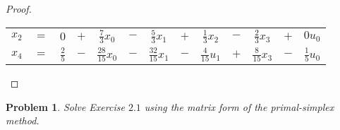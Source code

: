\documentclass[12pt,oneside]{amsart}
\numberwithin{equation}{section}
\numberwithin{figure}{section}
\theoremstyle{plain}
\newtheorem{prob}{Problem}
\theoremstyle{definition}
\begin{document}
\begin{proof}
\begin{enumerate}
\begin{center}
\begin{tabular}{|ccccccccccccc|}
    \hline
    $x_2$   & $=$ & $0$            & $+$ & $\frac{7}{3}x_0$   & $-$ & $\frac{5}{3}x_1$   & $+$ & $\frac{1}{3}x_2$  & $-$ & $\frac{2}{3}x_3$  & $+$ & $0u_0$            \\
    $x_4$   & $=$ & $\frac{2}{5}$  & $-$ & $\frac{28}{15}x_0$ & $-$ & $\frac{32}{15}x_1$ & $-$ & $\frac{4}{15}u_1$ & $+$ & $\frac{8}{15}x_3$ & $-$ & $\frac{1}{5}u_0$  \\
    \hline
  \end{tabular}\end{center}
\end{enumerate}
\end{proof}

\begin{prob}
Solve Exercise $2.1$ using the matrix form of the primal-simplex method. \\
\end{prob}
\end{document}
